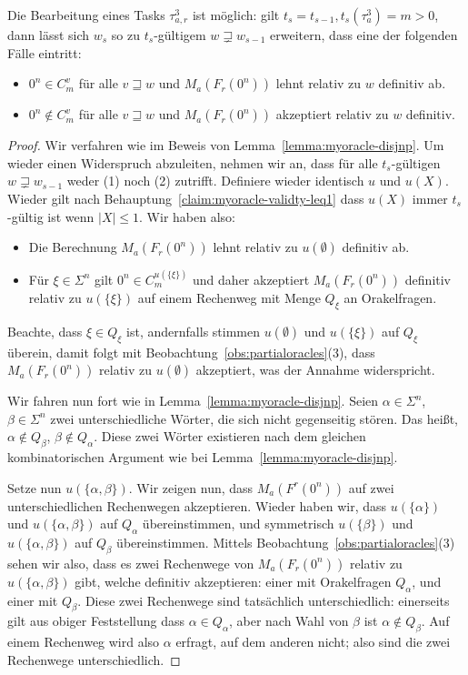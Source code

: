 \begin{lemma}\label{lemma:myoracle-up}
    Die Bearbeitung eines Tasks $\tau^3_{a,r}$ ist möglich: gilt $t_s=t_{s-1}, t_{s}(\tau^3_{a})=m>0$, dann lässt sich $w_{s}$ so zu $t_{s}$-gültigem $w\sqsupsetneq w_{s-1}$ erweitern, dass eine der folgenden Fälle eintritt:
        \begin{itemize}[nosep,endpenalty=10000]
            \item $0^n\in C_m^v$ für alle $v\sqsupseteq w$ und $M_a(F_r(0^n))$ lehnt relativ zu $w$ definitiv ab.
            \item $0^n\not\in C_m^v$ für alle $v\sqsupseteq w$ und $M_a(F_r(0^n))$ akzeptiert relativ zu $w$ definitiv.
        \end{itemize}
\end{lemma}
\begin{proof}
Wir verfahren wie im Beweis von Lemma~\ref{lemma:myoracle-disjnp}.
Um wieder einen Widerspruch abzuleiten, nehmen wir an, dass für alle $t_{s}$-gültigen $w\sqsupsetneq w_{s-1}$ weder (1) noch (2) zutrifft.
Definiere wieder identisch $u$ und $u(X)$.
Wieder gilt nach Behauptung~\ref{claim:myoracle-validty-leq1} dass $u(X)$ immer $t_{s}$-gültig ist wenn $|X|\leq 1$.
Wir haben also:
\begin{itemize}
    \item Die Berechnung $M_a(F_r(0^n))$ lehnt relativ zu $u(\emptyset)$ definitiv ab.
    \item Für $\xi\in \Sigma^{n}$ gilt $0^n\in C_m^{u(\{\xi\})}$ und daher akzeptiert $M_a(F_r(0^n))$ definitiv relativ zu $u(\{\xi\})$ auf einem Rechenweg mit Menge $Q_\xi$ an Orakelfragen.
\end{itemize}

Beachte, dass $\xi\in Q_\xi$ ist, andernfalls stimmen $u(\emptyset)$ und $u(\{\xi\})$ auf $Q_\xi$ überein, damit folgt mit Beobachtung~\ref{obs:partialoracles}(3), dass $M_a(F_r(0^n))$ relativ zu $u(\emptyset)$ akzeptiert, was der Annahme widerspricht.

Wir fahren nun fort wie in Lemma~\ref{lemma:myoracle-disjnp}.
Seien $\alpha\in\Sigma^{n}$, $\beta\in\Sigma^{n}$ zwei unterschiedliche Wörter, die sich nicht gegenseitig stören. Das heißt, $\alpha\not\in Q_\beta$, $\beta\not\in Q_\alpha$.
Diese zwei Wörter existieren nach dem gleichen kombinatorischen Argument wie bei Lemma~\ref{lemma:myoracle-disjnp}.

Setze nun $u(\{\alpha, \beta\})$. Wir zeigen nun, dass $M_a(F^r(0^n))$ auf zwei unterschiedlichen Rechenwegen akzeptieren.
Wieder haben wir, dass $u(\{\alpha\})$ und $u(\{\alpha, \beta\})$ auf $Q_\alpha$ übereinstimmen, und symmetrisch $u(\{\beta\})$ und $u(\{\alpha, \beta\})$ auf $Q_\beta$ übereinstimmen.
Mittels Beobachtung~\ref{obs:partialoracles}(3) sehen wir also, dass es zwei Rechenwege von $M_a(F_r(0^n))$ relativ zu $u(\{\alpha, \beta\})$ gibt, welche definitiv akzeptieren: einer mit Orakelfragen $Q_\alpha$, und einer mit $Q_\beta$.
Diese zwei Rechenwege sind tatsächlich unterschiedlich:
einerseits gilt aus obiger Feststellung dass $\alpha\in Q_\alpha$, aber nach Wahl von $\beta$ ist $\alpha\not\in Q_\beta$. Auf einem Rechenweg wird also $\alpha$ erfragt, auf dem anderen nicht; also sind die zwei Rechenwege unterschiedlich.



\end{proof}
